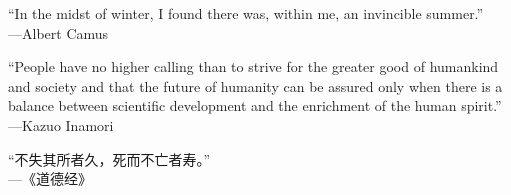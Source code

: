 
\thispagestyle{empty}  %


\begin{center}

\vspace{100pt}
``In the midst of winter, I found there was, within me, an invincible summer.''
\\
\vspace{20pt}
\hfill ---Albert Camus
\\
\vspace{60pt}

``People have no higher calling than to strive for the greater good of humankind and society and that the future of humanity can be assured only when there is a balance between scientific development and the enrichment of the human spirit.''
\\
\vspace{20pt}
\hfill ---Kazuo Inamori
\\
\vspace{60pt}

\begin{CJK}{UTF8}{gbsn}
``不失其所者久，死而不亡者寿。''
\\
\vspace{20pt}
\hfill ---《道德经》
\end{CJK}

\end{center}

\restoregeometry
